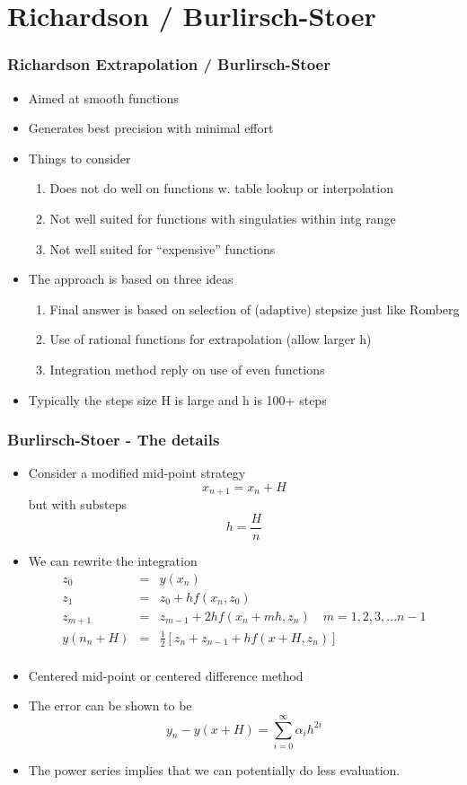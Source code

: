 \documentclass[10pt]{beamer}
\begin{document}
\section{Richardson / Burlirsch-Stoer}

\begin{frame}
  \frametitle{Richardson Extrapolation / Burlirsch-Stoer}
  \begin{itemize}
  \item Aimed at smooth functions 
  \item Generates best precision with minimal effort
  \item Things to consider
    \begin{enumerate}
    \item Does not do well on functions w. table lookup or interpolation
    \item Not well suited for functions with singulaties within intg range
    \item Not well suited for ``expensive'' functions
    \end{enumerate}
  \item The approach is based on three ideas
    \begin{enumerate}
    \item Final answer is based on selection of (adaptive) stepsize just like Romberg
    \item Use of rational functions for extrapolation (allow larger h)
    \item Integration method reply on use of even functions
    \end{enumerate}
  \item Typically the steps size H is large and h is 100+ steps
  \end{itemize}
\end{frame}

\begin{frame}
  \frametitle{Burlirsch-Stoer - The details}
  \begin{itemize}
  \item Consider a modified mid-point strategy
    \[
      x_{n+1} = x_n + H
    \] but with substeps
    \[
      h = \frac{H}{n}
    \]
  \item We can rewrite the integration
    \[
      \begin{array}{rcl}
        z_0 & = & y(x_n)\\
        z_1 & = & z_0 + h f( x_n, z_0 )\\
        z_{m+1} & = & z_{m-1} + 2h f(x_{n} + mh, z_n) \mbox{~~~} m = 1, 2, 3, ...{n-1}\\
        y(n_n + H) & = & \frac{1}{2} [ z_n + z_{n-1} + h f(x+H, z_n) ] \\ 
      \end{array}
    \]
  \item Centered mid-point or centered difference method
  \item The error can be shown to be
    \[
      y_n - y(x+H) = \sum_{i=0}^{\infty} \alpha_i h^{2i}
    \]
  \item The power series implies that we can potentially do less evaluation. 
  \end{itemize}
\end{frame}
\end{document}
